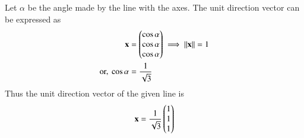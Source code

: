 Let $\alpha$ be the angle made by the line with the axes.  The unit direction vector can be expressed as
    \begin{align}
	    \mathbf{x} &= \begin{pmatrix}\cos\alpha\\\cos\alpha\\\cos\alpha\end{pmatrix} 
	\implies
	    \left\lVert\mathbf{x}\right\rVert  = 1
	\\
	    \text{or, }\cos\alpha &= \frac{1}{\sqrt{3}}
    \end{align}
    Thus the unit direction vector  of the given line is 
    \begin{align}
	    \mathbf{x} = \frac{1}{\sqrt{3}} \begin{pmatrix}1 \\ 1 \\ 1\end{pmatrix} 
\end{align}
    
